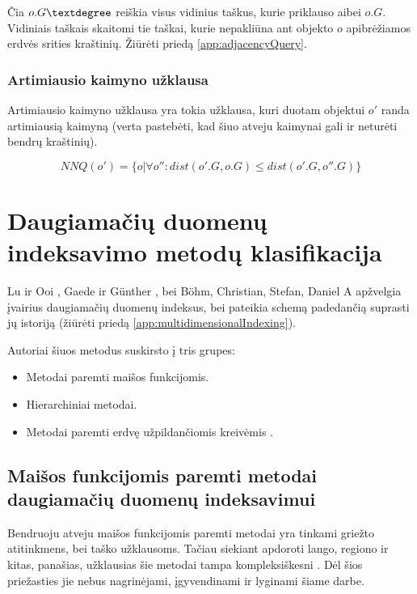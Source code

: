 Čia $o.G\textdegree$ reiškia visus vidinius taškus, kurie priklauso aibei $o.G$.
Vidiniais taškais skaitomi tie taškai, kurie nepakliūna ant objekto $o$ apibrėžiamos erdvės srities kraštinių.
Žiūrėti priedą \ref{app:adjacencyQuery}.


\subsubsection{Artimiausio kaimyno užklausa}
Artimiausio kaimyno užklausa yra tokia užklausa, kuri duotam objektui $o'$ randa artimiausią kaimyną (verta pastebėti, kad šiuo atveju kaimynai gali ir neturėti bendrų kraštinių).

\begin{equation}
	NNQ(o') = \{ o | \forall o'' : dist(o'.G, o.G) \leq dist(o'.G, o''.G) \}
\label{eq:ExactMatchQuery}
\end{equation}




\section{Daugiamačių duomenų indeksavimo metodų klasifikacija}
Lu ir Ooi \cite{lu1993spatial}, Gaede ir Günther \cite{gaede1998multidimensional}, bei B{\"o}hm, Christian, Stefan, Daniel A \cite{bohm2001searching} apžvelgia įvairius daugiamačių duomenų indeksus, bei pateikia schemą padedančią suprasti jų istoriją (žiūrėti priedą \ref{app:multidimensionalIndexing}).

Autoriai šiuos metodus suskirsto į tris grupes:
\begin{itemize}
	\item Metodai paremti maišos funkcijomis.
	\item Hierarchiniai metodai.
	\item Metodai paremti erdvę užpildančiomis kreivėmis \cite{bader2012space}.
\end{itemize}



\subsection{Maišos funkcijomis paremti metodai daugiamačių duomenų indeksavimui}

Bendruoju atveju maišos funkcijomis paremti metodai yra tinkami griežto atitinkmens, bei taško užklausoms.
Tačiau siekiant apdoroti lango, regiono ir kitas, panašias, užklausias šie metodai tampa kompleksiškesni \cite{nievergelt1981grid} \cite{tamminen1982excell}.
Dėl šios priežasties jie nebus nagrinėjami, įgyvendinami ir lyginami šiame darbe.


